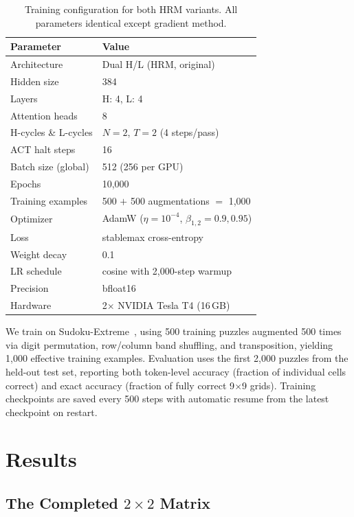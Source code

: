 \documentclass{article}
\begin{document}
\begin{table}[t]
\centering
\caption{Training configuration for both HRM variants. All parameters identical except gradient method.}
\label{tab:setup}
\begin{tabular}{ll}
\toprule
\textbf{Parameter} & \textbf{Value} \\
\midrule
Architecture & Dual H/L (HRM, original) \\
Hidden size & 384 \\
Layers & H: 4, L: 4 \\
Attention heads & 8 \\
H-cycles \& L-cycles & $N{=}2$, $T{=}2$ (4 steps/pass) \\
ACT halt steps & 16 \\
Batch size (global) & 512 (256 per GPU) \\
Epochs & 10,000 \\
Training examples & 500 $+$ 500 augmentations $=$ 1,000 \\
Optimizer & AdamW ($\eta{=}10^{-4}$, $\beta_{1,2}{=}0.9,0.95$) \\
Loss & stablemax cross-entropy \\
Weight decay & 0.1 \\
LR schedule & cosine with 2,000-step warmup \\
Precision & bfloat16 \\
Hardware & 2$\times$ NVIDIA Tesla T4 (16\,GB) \\
\bottomrule
\end{tabular}
\end{table}

We train on Sudoku-Extreme~\cite{sapient2025sudoku}, using 500 training puzzles augmented 500 times via digit permutation, row/column band shuffling, and transposition, yielding 1,000 effective training examples. Evaluation uses the first 2,000 puzzles from the held-out test set, reporting both token-level accuracy (fraction of individual cells correct) and exact accuracy (fraction of fully correct 9$\times$9 grids). Training checkpoints are saved every 500 steps with automatic resume from the latest checkpoint on restart.

\section{Results}

\subsection{The Completed $2\times2$ Matrix}
\end{document}
